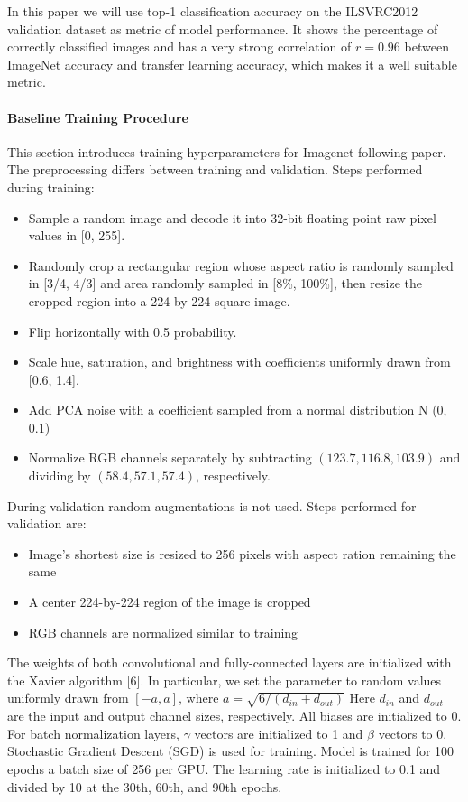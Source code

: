 In this paper we will use top-1 classification accuracy on the ILSVRC2012 validation dataset as metric of model performance. It shows the percentage of correctly classified images and has a very strong correlation of $r=0.96$ \cite{kornblith2019_better} between ImageNet accuracy and transfer learning accuracy, which makes it a well suitable metric.

\paragraph{Baseline Training Procedure} \label{subsec: baseline_training}
This section introduces training hyperparameters for Imagenet following \cite{he2016identity_resnetv2} paper. The preprocessing differs between training and validation. Steps performed during training:
\begin{itemize}
    \item Sample a random image and decode it into 32-bit floating point raw pixel values in [0, 255].
    \item Randomly crop a rectangular region whose aspect ratio is randomly sampled in [3/4, 4/3] and area randomly sampled in [8\%, 100\%], then resize the cropped region into a 224-by-224 square image.
    \item Flip horizontally with 0.5 probability.
    \item Scale hue, saturation, and brightness with coefficients uniformly drawn from [0.6, 1.4].
    \item Add PCA noise with a coefficient sampled from a normal distribution N (0, 0.1)
    \item Normalize RGB channels separately by subtracting $(123.7, 116.8, 103.9)$ and dividing by $(58.4, 57.1, 57.4)$, respectively.
\end{itemize}

During validation random augmentations is not used. Steps performed for validation are:

\begin{itemize}
  \item Image's shortest size is resized to 256 pixels with aspect ration remaining the same
  \item A center 224-by-224 region of the image is cropped
  \item RGB channels are normalized similar to training
\end{itemize}

The weights of both convolutional and fully-connected layers are initialized with the Xavier algorithm [6]. In particular, we set the parameter to random values uniformly drawn from $[−a, a]$, where $ a = \sqrt{6 / (d_{in} + d_{out})} $ Here $d_{in}$ and $d_{out}$ are the input and output channel sizes, respectively. All biases are initialized to 0. For batch normalization layers, $\gamma$ vectors are initialized to 1 and $\beta$ vectors to 0.
Stochastic Gradient Descent (SGD) is used for training. Model is trained for 100 epochs a batch size of 256 per GPU. The learning rate is initialized to 0.1 and divided by 10 at the 30th, 60th, and 90th epochs. %

